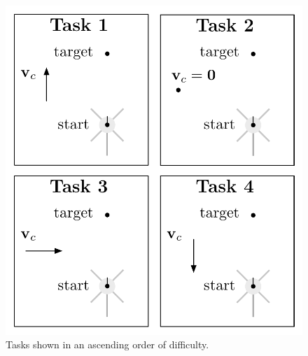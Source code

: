 \begin{figure}
  \centering
  \includegraphics[scale=0.8]{fig/tasks.pdf} 
  \caption[Tasks]{\label{fig:tasks}Tasks shown in an ascending order
    of difficulty.}
\end{figure} 

